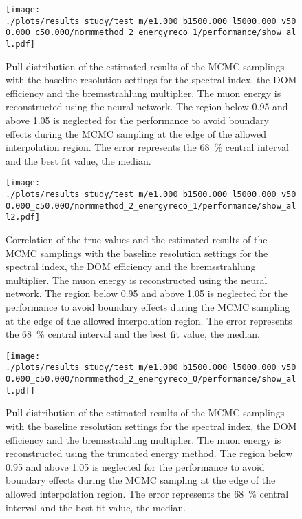 %

\begin{figure}
    \centering
    \texttt{[image: ./plots/results\_study/test\_m/e1.000\_b1500.000\_l5000.000\_v500.000\_c50.000/normmethod\_2\_energyreco\_1/performance/show\_all.pdf]}
    \caption{Pull distribution of the estimated results of the MCMC samplings with the baseline resolution settings for the spectral index, the DOM efficiency and the bremsstrahlung multiplier. The muon energy is reconstructed using the neural network. The region below 0.95 and above 1.05 is neglected for the performance to avoid boundary effects during the MCMC sampling at the edge of the allowed interpolation region. The error represents the \SI{68}{\%} central interval and the best fit value, the median.}
    \label{fig:study_result_pull_base_nn}
\end{figure}

\begin{figure}
    \centering
    \texttt{[image: ./plots/results\_study/test\_m/e1.000\_b1500.000\_l5000.000\_v500.000\_c50.000/normmethod\_2\_energyreco\_1/performance/show\_all2.pdf]}
    \caption{Correlation of the true values and the estimated results of the MCMC samplings with the baseline resolution settings for the spectral index, the DOM efficiency and the bremsstrahlung multiplier. The muon energy is reconstructed using the neural network. The region below 0.95 and above 1.05 is neglected for the performance to avoid boundary effects during the MCMC sampling at the edge of the allowed interpolation region. The error represents the \SI{68}{\%} central interval and the best fit value, the median.}
    \label{fig:study_result_corr_base_nn}
\end{figure}

%

\begin{figure}
    \centering
    \texttt{[image: ./plots/results\_study/test\_m/e1.000\_b1500.000\_l5000.000\_v500.000\_c50.000/normmethod\_2\_energyreco\_0/performance/show\_all.pdf]}
    \caption{Pull distribution of the estimated results of the MCMC samplings with the baseline resolution settings for the spectral index, the DOM efficiency and the bremsstrahlung multiplier. The muon energy is reconstructed using the truncated energy method. The region below 0.95 and above 1.05 is neglected for the performance to avoid boundary effects during the MCMC sampling at the edge of the allowed interpolation region. The error represents the \SI{68}{\%} central interval and the best fit value, the median.}
    \label{fig:study_result_pull_base_te}
\end{figure}

